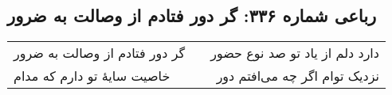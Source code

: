 \begin{center}
\section*{رباعی شماره ۳۳۶: گر دور فتادم از وصالت به ضرور}
\label{sec:sh336}
\begin{longtable}{l p{0.5cm} r}
گر دور فتادم از وصالت به ضرور
&&
دارد دلم از یاد تو صد نوع حضور
\\
خاصیت سایهٔ تو دارم که مدام
&&
نزدیک توام اگر چه می‌افتم دور
\\
\end{longtable}
\end{center}
